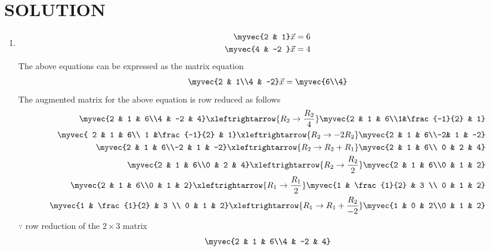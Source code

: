\documentclass[journal,12pt,twocolumn]{IEEEtran}
\begin{document}
\section{SOLUTION}
\begin{enumerate}
\item
\begin{align}
\begin{split}
\myvec{2 & 1}\vec{x}&=6
\\
\myvec{4 & -2 }\vec{x}&=4
\end{split}
\end{align}
The above equations can be expressed as the matrix equation
\begin{align}
\myvec{2 & 1\\4 & -2} \vec{x} = \myvec{6\\4}
\end{align}
%
The augmented matrix for the above equation is row reduced as follows
\begin{align}
\myvec{2 & 1 & 6\\4 & -2 & 4} 
\xleftrightarrow {R_2\rightarrow \frac{R_2}{4}}\myvec{2 & 1 & 6\\1&\frac{-1}{2} & 1} 
\\
\myvec{ 2 & 1 & 6\\ 1 &\frac{-1}{2} & 1}
\xleftrightarrow{R_2\rightarrow -2R_2}
\myvec{2 & 1 & 6\\-2& 1 & -2}
\\
\myvec{2 & 1 & 6\\-2 & 1 & -2}
\xleftrightarrow{R_2\rightarrow R_2+R_1}
\myvec{2 & 1 & 6\\ 0 & 2 & 4}
\\
\myvec{2 & 1 & 6\\0 & 2 & 4}
\xleftrightarrow{R_2\rightarrow\frac{R_2}{2}}
\myvec{2 & 1 & 6\\0 & 1 & 2}
\\
\myvec{2 & 1 & 6\\0 & 1 & 2}
\xleftrightarrow{R_1\rightarrow\frac{R_1}{2}}
\myvec{1 & \frac{1}{2} & 3 \\ 0 & 1 & 2}
\\
\myvec{1 & \frac{1}{2} & 3 \\ 0 & 1 & 2}
\xleftrightarrow{R_1\rightarrow R_1+\frac{R_2}{-2}}
\myvec{1 & 0 & 2\\0 & 1 & 2}
\end{align}
%
$\because$ row reduction of the $2\times 3$ matrix
%
\begin{align}
\myvec{2 & 1 & 6\\4 & -2 & 4}

\end{align}
\end{enumerate}
\end{document}
